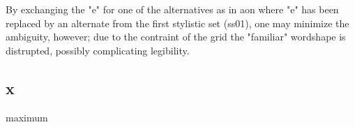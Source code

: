 \documentclass[a4paper]{article}
\begin{document}
By exchanging the "e" for one of the alternatives as in {\ssdefault aon} where "e" has
been replaced by an alternate from the first stylistic set (ss01), one may minimize
the ambiguity, however; due to the contraint of the grid the "familiar"
wordshape is distrupted, possibly complicating legibility.

\subsection{x}
{\ssdefault maximum}
\end{document}
